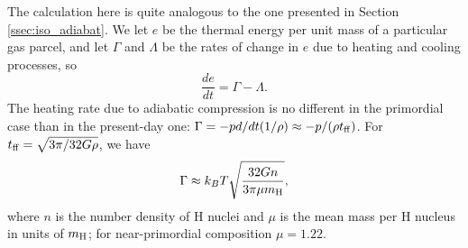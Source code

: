 The calculation here is quite analogous to the one presented in Section \ref{ssec:iso_adiabat}. We
let $e$ be the thermal energy per unit mass of a particular gas parcel, and let $\Gamma$ and $\Lambda$ be the rates of change in $e$ due to heating and cooling processes, so
\begin{equation}
\frac{de}{dt} = \Gamma - \Lambda.
\end{equation}
The heating rate due to adiabatic compression is no different in the primordial case than in the present-day one: $\Gamma = -p d/dt (1/\rho) \approx -p/(\rho t_{\rm ff})$. For $t_{\rm ff} = \sqrt{3\pi/32G\rho}$, we have
\begin{equation}
\Gamma \approx k_B T \sqrt{\frac{32 G n}{3\pi \mu m_{\rm H}}},
\end{equation}
where $n$ is the number density of H nuclei and $\mu$ is the mean mass per H nucleus in units of $m_{\rm H}$; for near-primordial composition $\mu = 1.22$.

